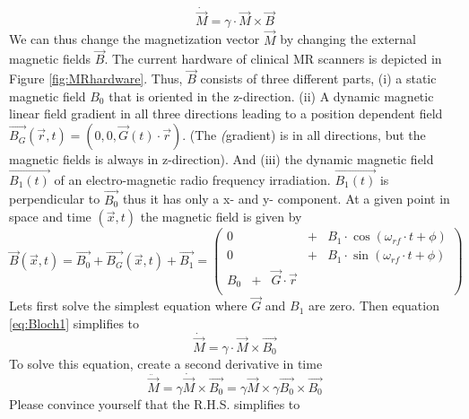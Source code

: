 \documentclass[a4paper,12pt]{extarticle}
\begin{document}
 \begin{equation} \label{eq:Bloch1}
\dot{\vec{M}}=\gamma\cdot \vec{M}\times\vec{B}
\end{equation}
 We can thus change the magnetization vector $\vec{M}$ by changing the external magnetic fields $\vec{B}$. The current hardware of clinical MR scanners is depicted in Figure \ref{fig:MRhardware}. Thus, $\vec{B}$ consists of three different parts, (i) a static magnetic field ${B_0}$ that is oriented in the z-direction. (ii) A dynamic magnetic linear field gradient in all three directions leading to a position dependent field $\vec{B_G}(\vec{r},t)=(0,0,\vec{G}(t)\cdot \vec{r})$. (The \emph(gradient) is in all directions, but the magnetic fields is always in z-direction).  And (iii) the dynamic magnetic field $\vec{B_1(t)}$ of an electro-magnetic radio frequency irradiation. $\vec{B_1(t)}$  is perpendicular to $\vec{B_0}$ thus it has only a x- and y- component. At a given point in space and time $(\vec{x},t)$ the magnetic field is given by
 \begin{equation} \label{eq:2}
 \vec{B}(\vec{x},t)  =  \vec{B_0} +\vec{B_G}(\vec{x},t) + \vec{B_1} = 
 \begin{pmatrix}
 0 &  & & + & B_1\cdot \cos(\omega_{rf}\cdot t+\phi) \\
 0 &  & & + & B_1\cdot \sin(\omega_{rf}\cdot t+\phi) \\
 B_0 & + & \vec{G}\cdot\vec{r} & \\
\end{pmatrix}
 \end{equation}
 Lets first solve the simplest equation where $\vec{G}$ and $B_1$ are zero. Then equation \eqref{eq:Bloch1} simplifies to \begin{equation} 
\dot{\vec{M}}=\gamma\cdot\vec{M}\times\vec{B_0}
\end{equation}
To solve this equation, create a second derivative in time
\begin{equation} 
\ddot{\vec{M}}=\gamma \dot{\vec{ M} }\times\vec{B_0} =\gamma\vec{M}\times\gamma\vec{B_0}\times\vec{B_0}
\end{equation}Please convince yourself that the R.H.S. simplifies to
\end{document}
